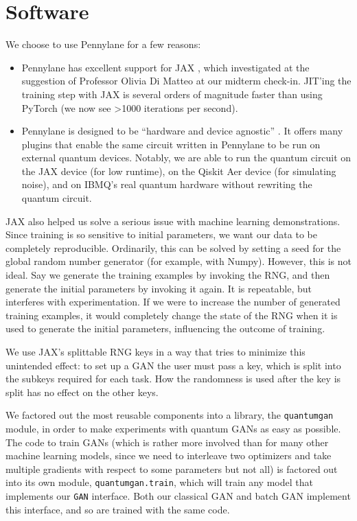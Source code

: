 \section{Software}

We choose to use Pennylane for a few reasons:
\begin{itemize}
    \item Pennylane has excellent support for JAX \autocite{jax}, which investigated at the suggestion of Professor Olivia Di Matteo at our midterm check-in. JIT'ing the training step with JAX is several orders of magnitude faster than using PyTorch (we now see >1000 iterations per second).
    \item Pennylane is designed to be ``hardware and device agnostic'' \autocite{pennylane}. It offers many plugins that enable the same circuit written in Pennylane to be run on external quantum devices. Notably, we are able to run the quantum circuit on the JAX device (for low runtime), on the Qiskit Aer device (for simulating noise), and on IBMQ's real quantum hardware without rewriting the quantum circuit.
\end{itemize}

JAX also helped us solve a serious issue with machine learning demonstrations.
Since training is so sensitive to initial parameters, we want our data to be
completely reproducible.  Ordinarily, this can be solved by setting a seed
for the global random number generator (for example, with Numpy).  However,
this is not ideal.  Say we generate the training examples by invoking the RNG,
and then generate the initial parameters by invoking it again.  It is 
repeatable, but interferes with experimentation.  If we were to increase the 
number of generated training examples, it would completely change the state of
the RNG when it is used to generate the initial parameters, influencing the 
outcome of training.

We use JAX's splittable RNG keys in a way that tries to minimize this 
unintended effect: to set up a GAN the user must pass a key, which is split
into the subkeys required for each task.  How the randomness is used after the
key is split has no effect on the other keys.

We factored out the most reusable components into a library, the 
\texttt{quantumgan} module, in order to make experiments with quantum GANs
as easy as possible.  The code to train GANs (which is rather more involved
than for many other machine learning models, since we need to interleave two
optimizers and take multiple gradients with respect to some parameters but
not all) is factored out into its own module, \texttt{quantumgan.train},
which will train any model that implements our \texttt{GAN} interface. Both
our classical GAN and batch GAN implement this interface, and so are
trained with the same code.

